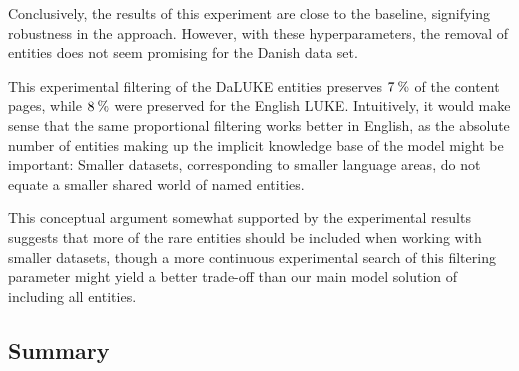 \documentclass[main.tex]{subfiles}
\begin{document}

Conclusively, the results of this experiment are close to the baseline, signifying robustness in the approach.
However, with these hyperparameters, the removal of entities does not seem promising for the Danish data set.

This experimental filtering of the DaLUKE entities preserves $7\:\text{\%{}}$ of the content pages, while $8\:\text{\%{}}$ were preserved for the English LUKE.
Intuitively, it would make sense that the same proportional filtering works better in English, as the absolute number of entities making up the implicit knowledge base of the model might be important:
Smaller datasets, corresponding to smaller language areas, do not equate a smaller shared world of named entities.

This conceptual argument somewhat supported by the experimental results suggests that more of the rare entities should be included when working with smaller datasets, though a more continuous experimental search of this filtering parameter might yield a better trade-off than our main model solution of including all entities.

\subsection{Summary} \label{subsec:preoverview}
\end{document}
